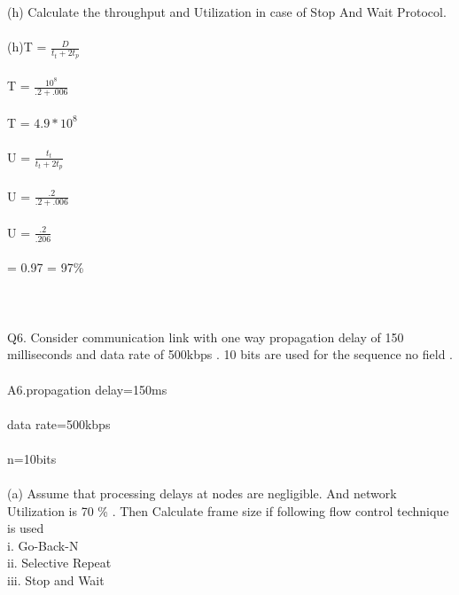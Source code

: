 \documentclass[a4paper,12pt]{article}
\begin{document}
(h) Calculate the throughput and Utilization in case of Stop And Wait Protocol.\\\\
(h)T = $\frac{D}{t_{t}+2t_{p}}$\\\\
 T = $\frac{10^8}{.2+.006}$ \\\\
 T = $ 4.9* 10^8$\\\\
 U = $\frac{t_{t}}{t_{t}+2t_{p}}$\\\\
 U = $\frac{.2}{.2 + .006}$\\\\
 U = $\frac{.2}{.206}$\\\\= 0.97 = 97\%\\\\\\\\
 
 Q6. Consider communication link with one way propagation delay of 150 milliseconds and
data rate of 500kbps . 10 bits are used for the sequence no field .\\\\
A6.propagation delay=150ms\\\\
   data rate=500kbps\\\\
   n=10bits\\\\
(a) Assume that processing delays at nodes are negligible. And network Utilization is
70 \% . Then Calculate frame size if following
flow control technique is used\\
i. Go-Back-N\\
ii. Selective Repeat\\
iii. Stop and Wait\\\\
\end{document}
